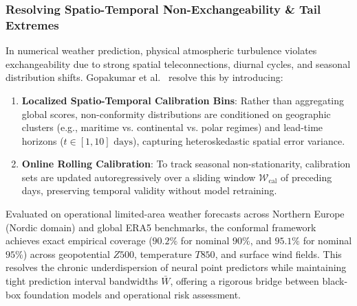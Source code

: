 \subsubsection{Resolving Spatio-Temporal Non-Exchangeability \& Tail Extremes}
In numerical weather prediction, physical atmospheric turbulence violates exchangeability due to strong spatial teleconnections, diurnal cycles, and seasonal distribution shifts. Gopakumar et al.~\cite{gopakumar2024conformal} resolve this by introducing:
\begin{enumerate}
    \item \textbf{Localized Spatio-Temporal Calibration Bins}: Rather than aggregating global scores, non-conformity distributions are conditioned on geographic clusters (e.g., maritime vs. continental vs. polar regimes) and lead-time horizons ($t \in [1, 10]\text{ days}$), capturing heteroskedastic spatial error variance.
    \item \textbf{Online Rolling Calibration}: To track seasonal non-stationarity, calibration sets are updated autoregressively over a sliding window $\mathcal{W}_{\text{cal}}$ of preceding days, preserving temporal validity without model retraining.
\end{enumerate}
Evaluated on operational limited-area weather forecasts across Northern Europe (Nordic domain) and global ERA5 benchmarks, the conformal framework achieves exact empirical coverage ($90.2\%$ for nominal $90\%$, and $95.1\%$ for nominal $95\%$) across geopotential $Z500$, temperature $T850$, and surface wind fields. This resolves the chronic underdispersion of neural point predictors while maintaining tight prediction interval bandwidths $\bar{W}$, offering a rigorous bridge between black-box foundation models and operational risk assessment.

